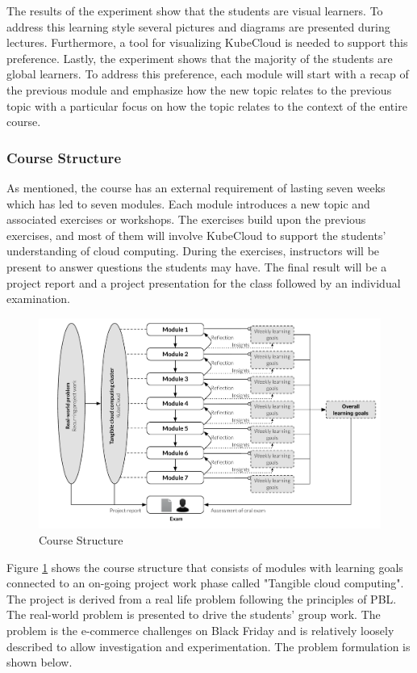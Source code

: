 \noindent
The results of the experiment show that the students are visual learners. To address this learning style several pictures and diagrams are presented during lectures. Furthermore, a tool for visualizing KubeCloud is needed to support this preference. Lastly, the experiment shows that the majority of the students are global learners. To address this preference, each module will start with a recap of the previous module and emphasize how the new topic relates to the previous topic with a particular focus on how the topic relates to the context of the entire course.

\subsubsection*{Course Structure}
As mentioned, the course has an external requirement of lasting seven weeks which has led to seven modules. Each module introduces a new topic and associated exercises or workshops. The exercises build upon the previous exercises, and most of them will involve KubeCloud to support the students' understanding of cloud computing. During the exercises, instructors will be present to answer questions the students may have. The final result will be a project report and a project presentation for the class followed by an individual examination. 

\begin{figure}[H]
    \includegraphics[width=\textwidth]{figures/course_structure}
    \caption{Course Structure}
    \label{fig:course_structure}
\end{figure}


\noindent 
Figure \ref{fig:course_structure} shows the course structure that consists of modules with learning goals connected to an on-going project work phase called "Tangible cloud computing". The project is derived from a real life problem following the principles of PBL. The real-world problem is presented to drive the students' group work. The problem is the e-commerce challenges on Black Friday and is relatively loosely described to allow investigation and experimentation. The problem formulation is shown below.

